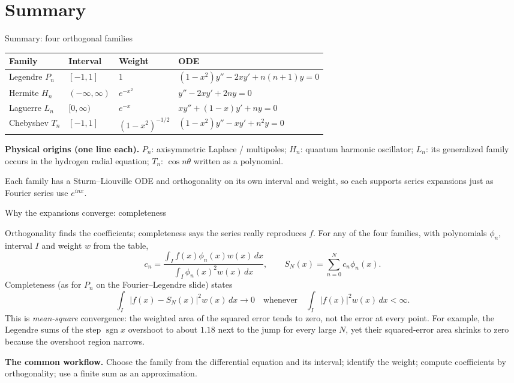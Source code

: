 \documentclass[11pt]{beamer}
\begin{document}
\section{Summary}

\begin{frame}{Summary: four orthogonal families}
\footnotesize
\begin{center}
\renewcommand{\arraystretch}{1.45}
\begin{tabular}{llll}
\textbf{Family} & \textbf{Interval} & \textbf{Weight} & \textbf{ODE} \\
\hline
Legendre $P_n$
  & $[-1,1]$
  & $1$
  & $(1-x^2)y''-2xy'+n(n+1)y=0$ \\
Hermite $H_n$
  & $(-\infty,\infty)$
  & $e^{-x^2}$
  & $y''-2xy'+2ny=0$ \\
Laguerre $L_n$
  & $[0,\infty)$
  & $e^{-x}$
  & $xy''+(1-x)y'+ny=0$ \\
Chebyshev $T_n$
  & $[-1,1]$
  & $(1-x^2)^{-1/2}$
  & $(1-x^2)y''-xy'+n^2y=0$ \\
\end{tabular}
\end{center}
\vspace{0.5em}
{\footnotesize
\textbf{Physical origins (one line each).}
 $P_n$: axisymmetric Laplace / multipoles;
$H_n$: quantum harmonic oscillator;
$L_n$: its generalized family occurs in the hydrogen radial equation;
$T_n$: $\cos n\theta$ written as a polynomial.
}

\vspace{0.4em}
Each family has a Sturm--Liouville ODE and orthogonality on its own interval
and weight, so each supports series expansions just as Fourier series use $e^{inx}$.
\end{frame}

\begin{frame}[allowframebreaks=1.00]{Why the expansions converge: completeness}
\footnotesize

Orthogonality finds the coefficients; completeness says the series really reproduces $f$.
For any of the four families, with polynomials $\phi_n$, interval $I$ and weight $w$ from the table,
\[
 c_n=\frac{\displaystyle\int_I f(x)\phi_n(x)w(x)\,dx}
            {\displaystyle\int_I\phi_n(x)^2w(x)\,dx},
 \qquad S_N(x)=\sum_{n=0}^N c_n\phi_n(x).
\]
Completeness (as for $P_n$ on the Fourier--Legendre slide) states
\[
 \int_I|f(x)-S_N(x)|^2w(x)\,dx\longrightarrow0
 \quad\text{whenever}\quad\int_I|f(x)|^2w(x)\,dx<\infty.
\]
This is \emph{mean-square} convergence: the weighted area of the squared error tends to
zero, not the error at every point.  For example, the Legendre sums of the step
$\operatorname{sgn}x$ overshoot to about $1.18$ next to the jump for every large $N$, yet their
squared-error area shrinks to zero because the overshoot region narrows.

\medskip
\textbf{The common workflow.} Choose the family from the differential equation
and its interval; identify the weight; compute coefficients by orthogonality;
use a finite sum as an approximation.
\end{frame}
\end{document}
